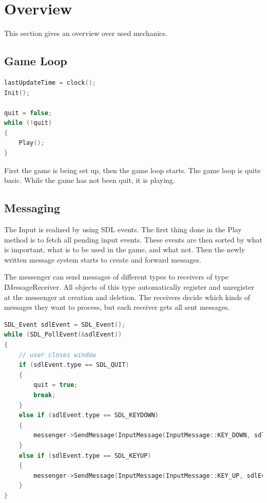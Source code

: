 \documentclass[12pt]{article}
\begin{document}
\newpage
\section{Overview}
\label{section:overview}

This section gives an overview over used mechanics.

\subsection{Game Loop}

\begin{lstlisting}[caption=The game loop, language=C++]
lastUpdateTime = clock();
Init();

quit = false;
while (!quit)
{
	Play();
}
\end{lstlisting}

First the game is being set up, then the game loop starts. The game loop is quite basic. While the game has not been quit, it is playing.\newline

\subsection{Messaging}

The Input is realized by using SDL events. The first thing done in the Play method is to fetch all pending input events. These events are then sorted by what is important, what is to be used in the game, and what not. Then the newly written message system starts to create and forward messages.

The messenger can send messages of different types to receivers of type IMessageReceiver. All objects of this type automatically register and unregister at the messenger at creation and deletion. The receivers decide which kinds of messages they want to process, but each receiver gets all sent messages.

\begin{lstlisting}[caption=Messaging, language=C++]
SDL_Event sdlEvent = SDL_Event();
while (SDL_PollEvent(&sdlEvent))
{
	// user closes window
	if (sdlEvent.type == SDL_QUIT)
	{
		quit = true;
		break;
	}
	else if (sdlEvent.type == SDL_KEYDOWN)
	{
		messenger->SendMessage(InputMessage(InputMessage::KEY_DOWN, sdlEvent.key.keysym.sym));
	}
	else if (sdlEvent.type == SDL_KEYUP)
	{
		messenger->SendMessage(InputMessage(InputMessage::KEY_UP, sdlEvent.key.keysym.sym));
	}
}
\end{lstlisting}
\end{document}
